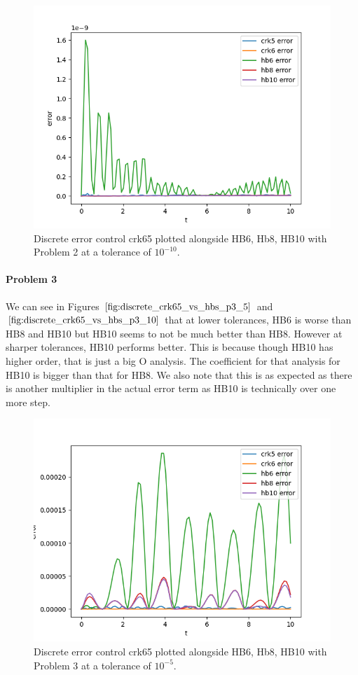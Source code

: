 \begin{figure}[H]
\centering
\includegraphics[width=0.7\linewidth]{./figures/discrete_crk65_vs_hbs_p2_10}
\caption{Discrete error control crk65 plotted alongside HB6, Hb8, HB10 with Problem 2 at a tolerance of $10^{-10}$.}
\label{fig:discrete_crk65_vs_hbs_p2_10}
\end{figure}

\paragraph{Problem 3} We can see in Figures $\ref{fig:discrete_crk65_vs_hbs_p3_5}$ and $\ref{fig:discrete_crk65_vs_hbs_p3_10}$ that at lower tolerances, HB6 is worse than HB8 and HB10 but HB10 seems to not be much better than HB8. However at sharper tolerances, HB10 performs better. This is because though HB10 has higher order, that is just a big O analysis. The coefficient for that analysis for HB10 is bigger than that for HB8. We also note that this is as expected as there is another multiplier in the actual error term as HB10 is technically over one more step. 


\begin{figure}[H]
\centering
\includegraphics[width=0.7\linewidth]{./figures/discrete_crk65_vs_hbs_p3_5}
\caption{Discrete error control crk65 plotted alongside HB6, Hb8, HB10 with Problem 3 at a tolerance of $10^{-5}$.}
\label{fig:discrete_crk65_vs_hbs_p3_5}
\end{figure}

